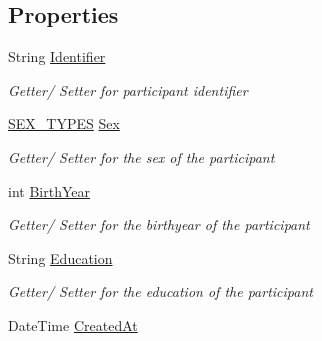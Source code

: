 \subsection*{Properties}
\begin{DoxyCompactItemize}
\item 
String \hyperlink{class_web_analyzer_1_1_models_1_1_base_1_1_experiment_participant_ac46dd512ce1496fa07e4304d5293fd13}{Identifier}
\begin{DoxyCompactList}\small\item\em Getter/ Setter for participant identifier \end{DoxyCompactList}\item 
\hyperlink{class_web_analyzer_1_1_models_1_1_base_1_1_experiment_participant_a38a0a0bc1d3ad083204da1de1fb93754}{S\+E\+X\+\_\+\+T\+Y\+P\+E\+S} \hyperlink{class_web_analyzer_1_1_models_1_1_base_1_1_experiment_participant_af836bfc33d73671eec06864ce395b9a2}{Sex}
\begin{DoxyCompactList}\small\item\em Getter/ Setter for the sex of the participant \end{DoxyCompactList}\item 
int \hyperlink{class_web_analyzer_1_1_models_1_1_base_1_1_experiment_participant_a0f2caf65917325b6ff1422a0e12408a1}{Birth\+Year}
\begin{DoxyCompactList}\small\item\em Getter/ Setter for the birthyear of the participant \end{DoxyCompactList}\item 
String \hyperlink{class_web_analyzer_1_1_models_1_1_base_1_1_experiment_participant_aeed3afa47a4a966a0d5c3277348c2846}{Education}
\begin{DoxyCompactList}\small\item\em Getter/ Setter for the education of the participant \end{DoxyCompactList}\item 
Date\+Time \hyperlink{class_web_analyzer_1_1_models_1_1_base_1_1_experiment_participant_a9149e7b45b96c79f529042c1b208d086}{Created\+At}

\end{DoxyCompactItemize}
